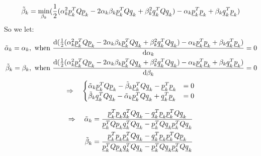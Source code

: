 \documentclass[11pt,letterpaper]{article}
\begin{document}
\begin{tcolorbox}
\begin{itemize}
\begin{align*}
        \Tilde{\beta}_k = \min_{\beta_k}(\frac{1}{2} 
            (\alpha_k^2 \underline p_k^T Q \underline p_k 
            - 2\alpha_k\beta_k \underline p_k^T Q \underline q_k 
            + \beta_k^2 \underline q_k^T Q \underline q_k)
            - \alpha_k \underline p_k^T \underline p_k 
            + \beta_k \underline q_k^T \underline p_k)
        \end{align*}
        So we let:
        \begin{align*}
            \Tilde{\alpha}_k = \alpha_k, \text{ when } 
            \frac{\mathrm{d}
            (\frac{1}{2} 
            (\alpha_k^2 \underline p_k^T Q \underline p_k 
            - 2\alpha_k\beta_k \underline p_k^T Q \underline q_k 
            + \beta_k^2 \underline q_k^T Q \underline q_k)
            - \alpha_k \underline p_k^T \underline p_k 
            + \beta_k \underline q_k^T \underline p_k)}
            {\mathrm{d} \alpha_k}
            =0 \\
            \Tilde{\beta}_k = \beta_k, \text{ when } 
            \frac{\mathrm{d}
            (\frac{1}{2} 
            (\alpha_k^2 \underline p_k^T Q \underline p_k 
            - 2\alpha_k\beta_k \underline p_k^T Q \underline q_k 
            + \beta_k^2 \underline q_k^T Q \underline q_k)
            - \alpha_k \underline p_k^T \underline p_k 
            + \beta_k \underline q_k^T \underline p_k)}
            {\mathrm{d} \beta_k}
            =0 
        \end{align*}
        \begin{align*}
            \Rightarrow \quad 
            \begin{cases}
             \Tilde{\alpha}_k \underline p_k^T Q \underline p_k - \Tilde{\beta}_k \underline p_k^T Q \underline q_k - \underline p_k^T \underline p_k &= 0\\
             \Tilde{\beta}_k \underline q_k^T Q \underline q_k - \Tilde{\alpha}_k \underline p_k^T Q \underline q_k + \underline q_k^T \underline p_k &= 0
            \end{cases}
        \end{align*}
            
        \begin{align*}
            \Rightarrow \quad
                \Tilde{\alpha}_k &= \frac{\underline p_k^T \underline p_k \underline q_k^T Q \underline q_k - 
                \underline q_k^T \underline p_k \underline p_k^T Q \underline q_k}
                {\underline p_k^T Q \underline p_k \underline q_k^T Q \underline q_k - \underline p_k^T Q \underline q_k \underline p_k^T Q \underline q_k}\\
                \Tilde{\beta}_k &= \frac{\underline p_k^T \underline p_k \underline p_k^T Q \underline q_k - 
                \underline q_k^T \underline p_k \underline p_k^T Q \underline p_k}
                {\underline p_k^T Q \underline p_k \underline q_k^T Q \underline q_k - \underline p_k^T Q \underline q_k \underline p_k^T Q \underline q_k}
        \end{align*}
    \end{itemize}
\end{tcolorbox}
\end{document}
